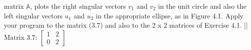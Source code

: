 \documentclass[12pt]{article}
\begin{document}
matrix $\mathbb{A}$, plots the right singular vectors $v_1$ and $v_2$ in the unit circle and also
the left singular vectors $u_1$ and $u_2$ in the appropriate ellipse, as in Figure 4.1.
Apply your program to the matrix (3.7) and also to the 2 x 2 matrices of Exercise 4.1. ||
$\text{Matrix 3.7: }
	\begin{bmatrix}
		1 & 2 \\
		0 & 2
	\end{bmatrix}
$ \\
	\begin{figure}[h!]
		\centering
		 \\
		 \\

\end{figure}
\end{document}
